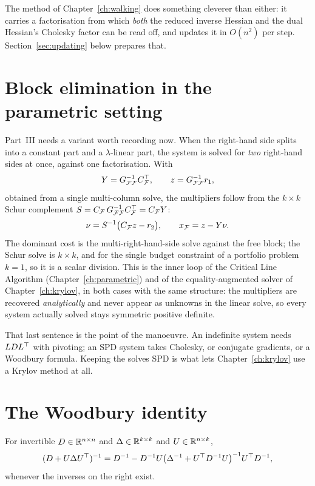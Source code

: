 The method of Chapter~\ref{ch:walking} does something cleverer than either: it
carries a factorisation from which \emph{both} the reduced inverse Hessian and the
dual Hessian's Cholesky factor can be read off, and updates it in $O(n^2)$ per
step. Section~\ref{sec:updating} below prepares that.

\section{Block elimination in the parametric setting}

Part~III needs a variant worth recording now. When the right-hand side splits into
a constant part and a $\lambda$-linear part, the system is solved for \emph{two}
right-hand sides at once, against one factorisation. With
\[
  Y = G_{\mathcal{F}\mathcal{F}}^{-1} C_{\mathcal{F}}^{\top}, \qquad
  z = G_{\mathcal{F}\mathcal{F}}^{-1} r_1,
\]
obtained from a single multi-column solve, the multipliers follow from the
$k \times k$ Schur complement $S = C_{\mathcal{F}}\,G_{\mathcal{F}\mathcal{F}}^{-1} C_{\mathcal{F}}^{\top} = C_{\mathcal{F}} Y$:
\begin{equation}
  \nu = S^{-1}\bigl(C_{\mathcal{F}} z - r_2\bigr),
  \qquad
  x_{\mathcal{F}} = z - Y\nu .
  \label{eq:blockelim}
\end{equation}
The dominant cost is the multi-right-hand-side solve against the free block; the
Schur solve is $k\times k$, and for the single budget constraint of a portfolio
problem $k = 1$, so it is a scalar division. This is the inner loop of the
Critical Line Algorithm (Chapter~\ref{ch:parametric}) and of the equality-augmented
solver of Chapter~\ref{ch:krylov}, in both cases with the same structure: the
multipliers are recovered \emph{analytically} and never appear as unknowns in the
linear solve, so every system actually solved stays symmetric positive definite.

That last sentence is the point of the manoeuvre. An indefinite system needs
$LDL^{\top}$ with pivoting; an SPD system takes Cholesky, or conjugate gradients, or a
Woodbury formula. Keeping the solves SPD is what lets Chapter~\ref{ch:krylov} use
a Krylov method at all.

\section{The Woodbury identity}

\begin{proposition}
\label{prop:woodbury}
For invertible $D \in \mathbb{R}^{n\times n}$ and $\Delta \in \mathbb{R}^{k\times k}$ and
$U \in \mathbb{R}^{n\times k}$,
\[
  (D + U\Delta U^{\top})^{-1}
   = D^{-1} - D^{-1}U\bigl(\Delta^{-1} + U^{\top} D^{-1} U\bigr)^{-1} U^{\top} D^{-1},
\]
whenever the inverses on the right exist.
\end{proposition}

